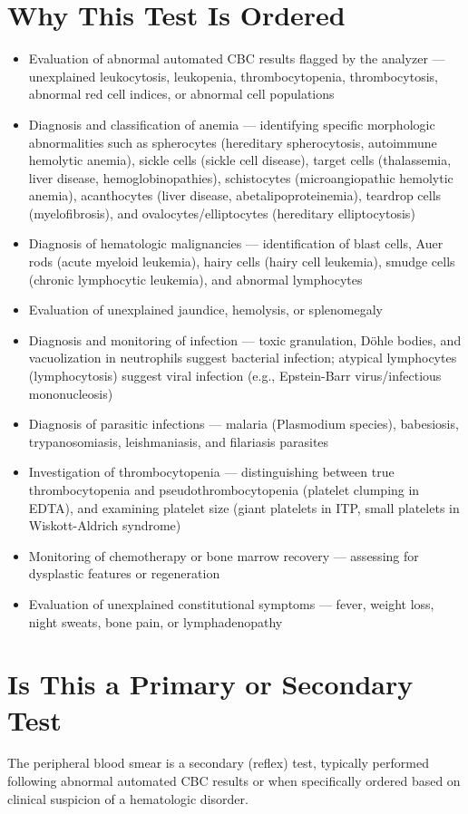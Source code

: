 \section*{Why This Test Is Ordered}
\begin{itemize}
  \item Evaluation of abnormal automated CBC results flagged by the analyzer --- unexplained leukocytosis, leukopenia, thrombocytopenia, thrombocytosis, abnormal red cell indices, or abnormal cell populations
  \item Diagnosis and classification of anemia --- identifying specific morphologic abnormalities such as spherocytes (hereditary spherocytosis, autoimmune hemolytic anemia), sickle cells (sickle cell disease), target cells (thalassemia, liver disease, hemoglobinopathies), schistocytes (microangiopathic hemolytic anemia), acanthocytes (liver disease, abetalipoproteinemia), teardrop cells (myelofibrosis), and ovalocytes/elliptocytes (hereditary elliptocytosis)
  \item Diagnosis of hematologic malignancies --- identification of blast cells, Auer rods (acute myeloid leukemia), hairy cells (hairy cell leukemia), smudge cells (chronic lymphocytic leukemia), and abnormal lymphocytes
  \item Evaluation of unexplained jaundice, hemolysis, or splenomegaly
  \item Diagnosis and monitoring of infection --- toxic granulation, D\"{o}hle bodies, and vacuolization in neutrophils suggest bacterial infection; atypical lymphocytes (lymphocytosis) suggest viral infection (e.g., Epstein-Barr virus/infectious mononucleosis)
  \item Diagnosis of parasitic infections --- malaria (Plasmodium species), babesiosis, trypanosomiasis, leishmaniasis, and filariasis parasites
  \item Investigation of thrombocytopenia --- distinguishing between true thrombocytopenia and pseudothrombocytopenia (platelet clumping in EDTA), and examining platelet size (giant platelets in ITP, small platelets in Wiskott-Aldrich syndrome)
  \item Monitoring of chemotherapy or bone marrow recovery --- assessing for dysplastic features or regeneration
  \item Evaluation of unexplained constitutional symptoms --- fever, weight loss, night sweats, bone pain, or lymphadenopathy
\end{itemize}

\section*{Is This a Primary or Secondary Test}
The peripheral blood smear is a secondary (reflex) test, typically performed following abnormal automated CBC results or when specifically ordered based on clinical suspicion of a hematologic disorder.

